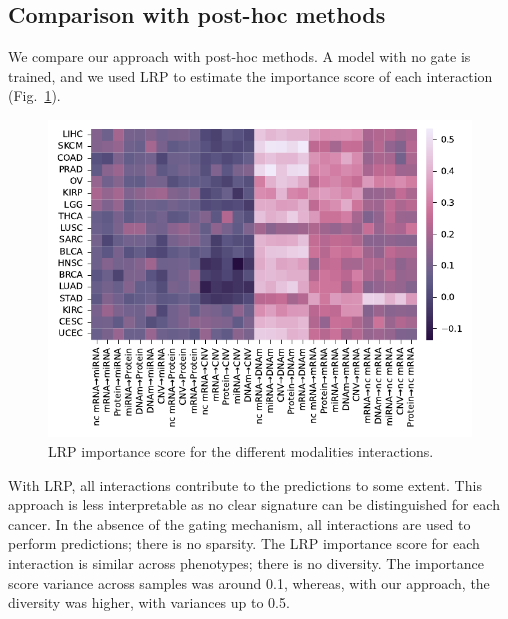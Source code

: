 \documentclass[../main.tex]{subfiles}
\begin{document}
 \subsection{Comparison with post-hoc methods}

     We compare our approach with post-hoc methods.
     A model with no gate is trained, and we used LRP to estimate the importance score of each interaction (Fig.~\ref{fig:signature_LRP}).

     \begin{figure}[htbp]
         \centering
         \includegraphics[scale=0.75]{signature_alphas_LRP.pdf}
         \caption{LRP importance score for the different modalities interactions.}
         \label{fig:signature_LRP}
     \end{figure}

     With LRP, all interactions contribute to the predictions to some extent.
     This approach is less interpretable as no clear signature can be distinguished for each cancer.
     In the absence of the gating mechanism, all interactions are used to perform predictions; there is no sparsity.
     The LRP importance score for each interaction is similar across phenotypes; there is no diversity.
     The importance score variance across samples was around 0.1, whereas, with our approach, the diversity was higher, with variances up to 0.5.
\end{document}
